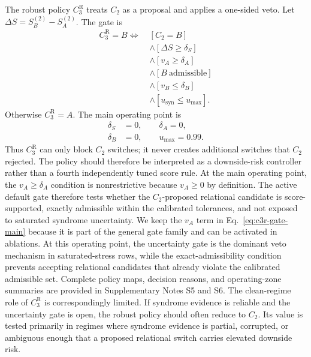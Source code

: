 \documentclass{iopjournal}
\begin{document}
The robust policy $C_3^{\mathrm{R}}$ treats $C_2$ as a proposal and applies a
one-sided veto. Let $\Delta S=S_B^{(2)}-S_A^{(2)}$. The gate is
\begin{equation}
\begin{aligned}
C_3^{\mathrm{R}}=B
\Longleftrightarrow\;&
\left[C_2=B\right]
\\
&\wedge
\left[\Delta S\ge\delta_S\right]
\\
&\wedge
\left[v_A\ge\delta_A\right]
\\
&\wedge
\left[B\ \mathrm{admissible}\right]
\\
&\wedge
\left[v_B\le\delta_B\right]
\\
&\wedge
\left[u_{\mathrm{syn}}\le u_{\max}\right].
\end{aligned}
\label{eq:c3r-gate-main}
\end{equation}
Otherwise $C_3^{\mathrm{R}}=A$. The main operating point is
\begin{equation}
\begin{aligned}
\delta_S&=0,
\qquad
\delta_A=0,\\
\delta_B&=0,
\qquad
u_{\max}=0.99.
\end{aligned}
\end{equation}
Thus $C_3^{\mathrm{R}}$ can only block $C_2$ switches; it never creates additional
switches that $C_2$ rejected. The policy should therefore be interpreted as a
downside-risk controller rather than a fourth independently tuned score rule.
At the main operating point, the $v_A\ge\delta_A$ condition is nonrestrictive
because $v_A\ge0$ by definition. The active default gate therefore tests whether
the $C_2$-proposed relational candidate is score-supported, exactly admissible
within the calibrated tolerances, and not exposed to saturated syndrome
uncertainty. We keep the $v_A$ term in Eq.~\eqref{eq:c3r-gate-main} because it is
part of the general gate family and can be activated in ablations.
At this operating point, the uncertainty gate is the dominant veto mechanism in
saturated-stress rows, while the exact-admissibility condition prevents accepting
relational candidates that already violate the calibrated admissible set.
Complete policy maps, decision reasons, and operating-zone summaries are provided in
Supplementary Notes S5 and S6.
The clean-regime role of $C_3^{\mathrm R}$ is correspondingly limited. If syndrome
evidence is reliable and the uncertainty gate is open, the robust policy should
often reduce to $C_2$. Its value is tested primarily in regimes where syndrome
evidence is partial, corrupted, or ambiguous enough that a proposed relational
switch carries elevated downside risk.
\end{document}
